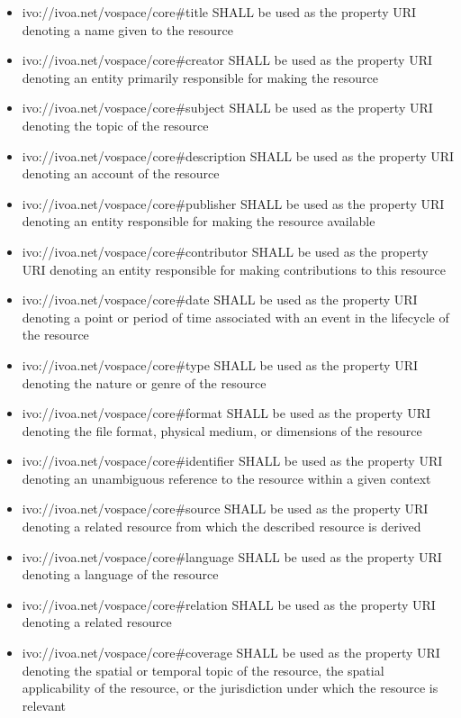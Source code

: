 \documentclass[11pt,a4paper]{ivoa}
\begin{document}
\begin{itemize}
    \item ivo://ivoa.net/vospace/core\#title SHALL be used as the property URI denoting a name given to the resource
    \item ivo://ivoa.net/vospace/core\#creator SHALL be used as the property URI denoting an entity primarily responsible for making the resource
    \item ivo://ivoa.net/vospace/core\#subject SHALL be used as the property URI denoting the topic of the resource
    \item ivo://ivoa.net/vospace/core\#description SHALL be used as the property URI denoting an account of the resource
    \item ivo://ivoa.net/vospace/core\#publisher SHALL be used as the property URI denoting an entity responsible for making the resource available
    \item ivo://ivoa.net/vospace/core\#contributor SHALL be used as the property URI denoting an entity responsible for making contributions to this resource
    \item ivo://ivoa.net/vospace/core\#date SHALL be used as the property URI denoting a point or period of time associated with an event in the lifecycle of the resource
    \item ivo://ivoa.net/vospace/core\#type SHALL be used as the property URI denoting the nature or genre of the resource
    \item ivo://ivoa.net/vospace/core\#format SHALL be used as the property URI denoting the file format, physical medium, or dimensions of the resource
    \item ivo://ivoa.net/vospace/core\#identifier SHALL be used as the property URI denoting an unambiguous reference to the resource within a given context
    \item ivo://ivoa.net/vospace/core\#source SHALL be used as the property URI denoting a related resource from which the described resource is derived
    \item ivo://ivoa.net/vospace/core\#language SHALL be used as the property URI denoting a language of the resource
    \item ivo://ivoa.net/vospace/core\#relation SHALL be used as the property URI denoting a related resource
    \item ivo://ivoa.net/vospace/core\#coverage SHALL be used as the property URI denoting the spatial or temporal topic of the resource, the spatial applicability of the resource, or the jurisdiction under which the resource is relevant

\end{itemize}
\end{document}
